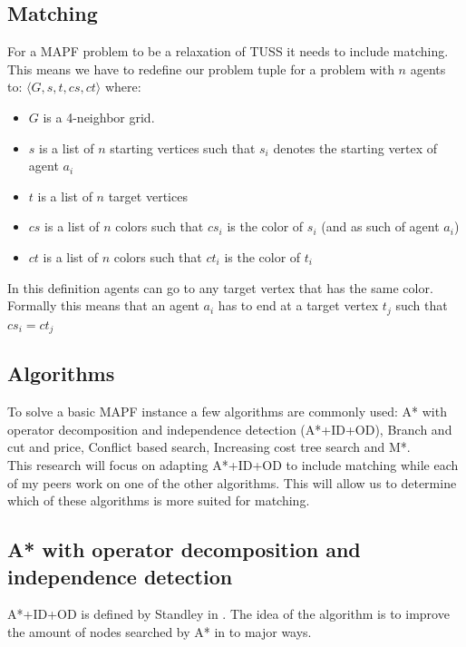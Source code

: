 \documentclass[english]{article}
\begin{document}
\subsection{Matching}
For a MAPF problem to be a relaxation of TUSS it needs to include matching.
This means we have to redefine our problem tuple for a problem with $n$ agents to: $\langle G, s,t, cs, ct\rangle$ where:
\begin{itemize}
	\item $G$ is a 4-neighbor grid.
	\item $s$ is a list of $n$ starting vertices such that $s_i$ denotes the starting vertex of agent $a_i$
	\item $t$ is a list of $n$ target vertices
	\item $cs$ is a list of $n$ colors such that $cs_i$ is the color of $s_i$ (and as such of agent $a_i$)
	\item $ct$ is a list of $n$ colors such that $ct_i$ is the color of $t_i$
\end{itemize}
In this definition agents can go to any target vertex that has the same color.
Formally this means that an agent $a_i$ has to end at a target vertex $t_j$ such that $cs_i=ct_j$

\subsection{Algorithms}
To solve a basic MAPF instance a few algorithms are commonly used: A* with operator decomposition and independence detection (A*+ID+OD)\cite{AStarIDOD_standley_2010}, Branch and cut and price\cite{bcp_lam_2019}, Conflict based search\cite{conflict_based_search_sharon_2015}, Increasing cost tree search\cite{icts_sharon_2013} and M*\cite{mstar_wagner_2011}.
\\
This research will focus on adapting A*+ID+OD to include matching while each of my peers work on one of the other algorithms.
This will allow us to determine which of these algorithms is more suited for matching.

\subsection{A* with operator decomposition and independence detection}
A*+ID+OD is defined by Standley in \cite{AStarIDOD_standley_2010}.
The idea of the algorithm is to improve the amount of nodes searched by A* in to major ways.
\end{document}

